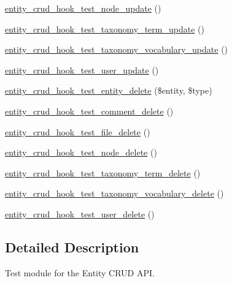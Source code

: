 \begin{DoxyCompactItemize}
\item 
\hyperlink{entity__crud__hook__test_8module_ae2b4096dc8c1ec6d60c3dcdc84acebd8}{entity\_\-crud\_\-hook\_\-test\_\-node\_\-update} ()
\item 
\hyperlink{entity__crud__hook__test_8module_a981abb0f7e1013cc96ec74a69aa00feb}{entity\_\-crud\_\-hook\_\-test\_\-taxonomy\_\-term\_\-update} ()
\item 
\hyperlink{entity__crud__hook__test_8module_ac6839d04ff10b94f3180b7ae91687385}{entity\_\-crud\_\-hook\_\-test\_\-taxonomy\_\-vocabulary\_\-update} ()
\item 
\hyperlink{entity__crud__hook__test_8module_a87aaec41fce1db56bb3dbe4048b161e9}{entity\_\-crud\_\-hook\_\-test\_\-user\_\-update} ()
\item 
\hyperlink{entity__crud__hook__test_8module_a85097a52cb0cfd73f9b0d9ad599d282d}{entity\_\-crud\_\-hook\_\-test\_\-entity\_\-delete} (\$entity, \$type)
\item 
\hyperlink{entity__crud__hook__test_8module_a77c049a94d2a1cb3ee5ba660d1cd7e94}{entity\_\-crud\_\-hook\_\-test\_\-comment\_\-delete} ()
\item 
\hyperlink{entity__crud__hook__test_8module_aa64fca74a5f0ee0608f8b9de7dc4ba40}{entity\_\-crud\_\-hook\_\-test\_\-file\_\-delete} ()
\item 
\hyperlink{entity__crud__hook__test_8module_a91bf8d24a31eee6bde33cd39ba35a280}{entity\_\-crud\_\-hook\_\-test\_\-node\_\-delete} ()
\item 
\hyperlink{entity__crud__hook__test_8module_aed7135044b1f6b1294a508933a5fe72b}{entity\_\-crud\_\-hook\_\-test\_\-taxonomy\_\-term\_\-delete} ()
\item 
\hyperlink{entity__crud__hook__test_8module_a7a503c89a328cb10f42878505a6d12b4}{entity\_\-crud\_\-hook\_\-test\_\-taxonomy\_\-vocabulary\_\-delete} ()
\item 
\hyperlink{entity__crud__hook__test_8module_a1572579c7d9fc369030afffc38275d11}{entity\_\-crud\_\-hook\_\-test\_\-user\_\-delete} ()
\end{DoxyCompactItemize}


\subsection{Detailed Description}
Test module for the Entity CRUD API. 

